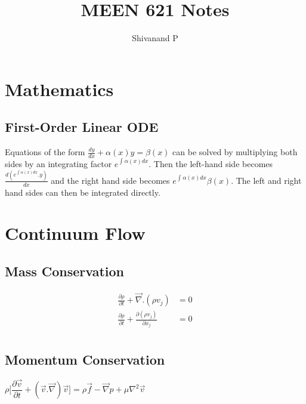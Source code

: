 \documentclass[10pt, letterpaper, notitlepage, landscape]{article}
\title{MEEN 621 Notes}
\author{Shivanand P}
\begin{document}
\sffamily
\sffamily{}

\maketitle
\renewcommand{\cftpartleader}{\cftdotfill{\cftdotsep}} %
\renewcommand{\cftsecleader}{\cftdotfill{\cftdotsep}}
\tableofcontents
\pagestyle{empty}

\newpage
\setcounter{page}{1}

\pagestyle{fancy}
\fancyhead{}    
\fancyfoot{}
\renewcommand{\headrulewidth}{0pt}
\renewcommand{\footrulewidth}{0pt}
\renewcommand{\arraystretch}{1.75}

\section{Mathematics}

\subsection{First-Order Linear ODE}
Equations of the form $\frac{dy}{dx} + \alpha(x) y = \beta(x)$ can be solved by multiplying both sides by an integrating factor $e^{\int_{}^{}\alpha(x)dx}$. Then the left-hand side becomes $\frac{d(e^{\int_{}^{}\alpha(x)dx}.y)}{dx}$ and the right hand side becomes $e^{\int_{}^{}\alpha(x)dx} \beta(x)$. The left and right hand sides can then be integrated directly.

\section{Continuum Flow}
\subsection{Mass Conservation}
\begin{align*}
\frac{\partial \rho}{\partial t} + \vec{\nabla} . (\rho v_j) &= 0 \\
\frac{\partial \rho}{\partial t} + \frac{\partial (\rho v_j)}{\partial x_j} &= 0 \\
\end{align*}

\subsection{Momentum Conservation}
$\rho \biggl[\dfrac{\partial{\vec{v}}}{\partial t} + (\vec{v}.\vec{\nabla})\vec{v}\biggr] = \rho \vec{f} -\vec{\nabla} p + \mu \nabla^2 \vec{v}$
\end{document}
